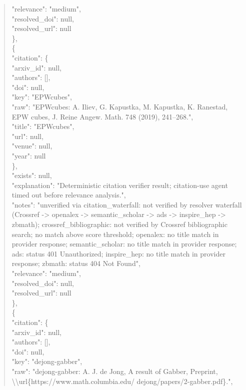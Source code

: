 \documentclass[11pt]{article}
\begin{document}
\begin{quote}
      "relevance": "medium",\\
      "resolved\_doi": null,\\
      "resolved\_url": null\\
    \},\\
    \{\\
      "citation": \{\\
        "arxiv\_id": null,\\
        "authors": [],\\
        "doi": null,\\
        "key": "EPWcubes",\\
        "raw": "EPWcubes: A. Iliev, G. Kapustka, M. Kapustka, K. Ranestad, EPW cubes, J. Reine Angew. Math. 748 (2019), 241--268.",\\
        "title": "EPWcubes",\\
        "url": null,\\
        "venue": null,\\
        "year": null\\
      \},\\
      "exists": null,\\
      "explanation": "Deterministic citation verifier result; citation-use agent timed out before relevance analysis.",\\
      "notes": "unverified via citation\_waterfall: not verified by resolver waterfall (Crossref -> openalex -> semantic\_scholar -> ads -> inspire\_hep -> zbmath); crossref\_bibliographic: not verified by Crossref bibliographic search; no match above score threshold; openalex: no title match in provider response; semantic\_scholar: no title match in provider response; ads: status 401 Unauthorized; inspire\_hep: no title match in provider response; zbmath: status 404 Not Found",\\
      "relevance": "medium",\\
      "resolved\_doi": null,\\
      "resolved\_url": null\\
    \},\\
    \{\\
      "citation": \{\\
        "arxiv\_id": null,\\
        "authors": [],\\
        "doi": null,\\
        "key": "dejong-gabber",\\
        "raw": "dejong-gabber: A. J. de Jong, A result of Gabber, Preprint, \textbackslash{}\textbackslash{}url\{https://www.math.columbia.edu/ dejong/papers/2-gabber.pdf\}.",\\

\end{quote}
\end{document}
